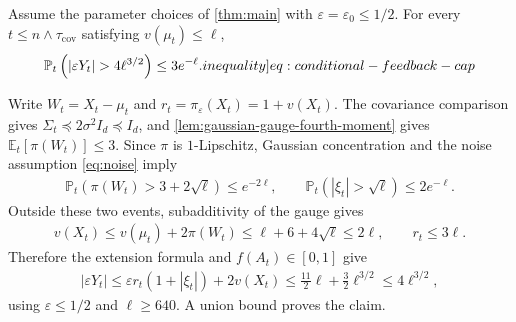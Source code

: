 \documentclass[12pt,cleveref]{jmlr}
\renewenvironment{proof}[1][\proofname]
{\par\noindent{\bfseries\upshape #1\ }}
{\jmlrQED}
\newcommand{\ineqlabel}[1]{\label[inequality]{#1}}
\newcommand{\E}{\mathbb E}
\newcommand{\Pp}{\mathbb P}
\newcommand{\1}{\mathbf 1}
\newcommand{\eps}{\varepsilon}
\begin{document}
\begin{lemma}
    \label{lem:conditional-feedback-cap}
    Assume the parameter choices of \cref{thm:main} with
    $\eps=\eps_0\leq1/2$. For every $t\leq n\wedge\tau_{\mathrm{cov}}$
    satisfying $v(\mu_t)\leq\ell$,
    \begin{align}
        \Pp_t\left(|\eps Y_t|>4\ell^{3/2}\right)\leq3e^{-\ell}.
        \ineqlabel{eq:conditional-feedback-cap}
    \end{align}
\end{lemma}
\begin{proof}
    Write $W_t=X_t-\mu_t$ and $r_t=\pi_\eps(X_t)=1+v(X_t)$.
    The covariance comparison gives
    $\Sigma_t\preceq2\sigma^2I_d\preceq I_d$, and
    \cref{lem:gaussian-gauge-fourth-moment} gives
    $\E_t[\pi(W_t)]\leq3$. Since $\pi$ is $1$-Lipschitz,
    Gaussian concentration and the noise assumption \cref{eq:noise}
    imply
    \begin{align}
        \Pp_t\left(\pi(W_t)>3+2\sqrt\ell\right)\leq e^{-2\ell},
        \qquad
        \Pp_t\left(|\xi_t|>\sqrt\ell\right)\leq2e^{-\ell}.
    \end{align}
    Outside these two events, subadditivity of the gauge gives
    \begin{align}
        v(X_t)\leq v(\mu_t)+2\pi(W_t)
        \leq\ell+6+4\sqrt\ell\leq2\ell,
        \qquad r_t\leq3\ell.
    \end{align}
    Therefore the extension formula and $f(A_t)\in[0,1]$ give
    \begin{align}
        |\eps Y_t|
        \leq\eps r_t(1+|\xi_t|)+2v(X_t)
        \leq\frac{11}{2}\ell+\frac32\ell^{3/2}
        \leq4\ell^{3/2},
    \end{align}
    using $\eps\leq1/2$ and $\ell\geq640$.
    A union bound proves the claim.
\end{proof}
\end{document}
